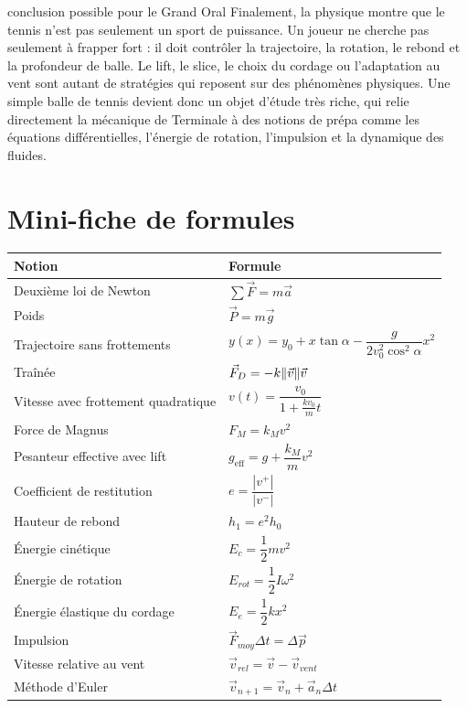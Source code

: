 \documentclass[11pt,a4paper]{article}
\begin{document}
\begin{oral}{conclusion possible pour le Grand Oral}
Finalement, la physique montre que le tennis n'est pas seulement un sport de puissance. Un joueur ne cherche pas seulement à frapper fort : il doit contrôler la trajectoire, la rotation, le rebond et la profondeur de balle. Le lift, le slice, le choix du cordage ou l'adaptation au vent sont autant de stratégies qui reposent sur des phénomènes physiques. Une simple balle de tennis devient donc un objet d'étude très riche, qui relie directement la mécanique de Terminale à des notions de prépa comme les équations différentielles, l'énergie de rotation, l'impulsion et la dynamique des fluides.
\end{oral}

\section{Mini-fiche de formules}

\begin{center}
\renewcommand{\arraystretch}{1.6}
\begin{tabular}{p{5cm}p{8cm}}
\toprule
\textbf{Notion} & \textbf{Formule} \\
\midrule
Deuxième loi de Newton & $\sum \vec{F}=m\vec{a}$ \\
Poids & $\vec{P}=m\vec{g}$ \\
Trajectoire sans frottements & $y(x)=y_0+x\tan\alpha-\dfrac{g}{2v_0^2\cos^2\alpha}x^2$ \\
Traînée & $\vec{F}_D=-k\norm{\vec{v}}\vec{v}$ \\
Vitesse avec frottement quadratique & $v(t)=\dfrac{v_0}{1+\frac{kv_0}{m}t}$ \\
Force de Magnus & $F_M=k_Mv^2$ \\
Pesanteur effective avec lift & $g_{\text{eff}}=g+\dfrac{k_M}{m}v^2$ \\
Coefficient de restitution & $e=\dfrac{|v^+|}{|v^-|}$ \\
Hauteur de rebond & $h_1=e^2h_0$ \\
Énergie cinétique & $E_c=\dfrac12mv^2$ \\
Énergie de rotation & $E_{rot}=\dfrac12I\omega^2$ \\
Énergie élastique du cordage & $E_e=\dfrac12kx^2$ \\
Impulsion & $\vec{F}_{moy}\Delta t=\Delta \vec{p}$ \\
Vitesse relative au vent & $\vec{v}_{rel}=\vec{v}-\vec{v}_{vent}$ \\
Méthode d'Euler & $\vec{v}_{n+1}=\vec{v}_n+\vec{a}_n\Delta t$ \\
\bottomrule
\end{tabular}
\end{center}
\end{document}
